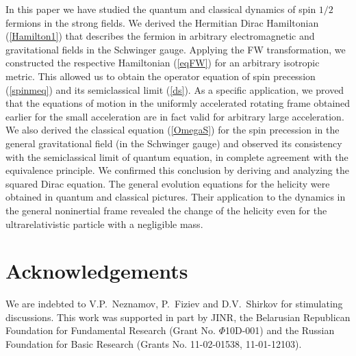 \documentclass[preprint,showpacs,preprintnumbers,eqsecnum,amsmath,amssymb]{revtex4}
\begin{document}
In this paper we have studied the quantum and classical dynamics
of spin $1/2$ fermions in the strong fields. We derived the
Hermitian Dirac Hamiltonian (\ref{Hamilton1}) that describes the
fermion in arbitrary electromagnetic and gravitational fields in
the Schwinger gauge. Applying the FW transformation, we
constructed the respective Hamiltonian (\ref{eqFW}) for an
arbitrary isotropic metric. This allowed us to obtain the operator
equation of spin precession (\ref{spinmeq}) and its semiclassical
limit (\ref{ds}). As a specific application, we proved that the
equations of motion in the uniformly accelerated rotating frame
obtained earlier for the small acceleration are in fact valid for
arbitrary large acceleration. We also derived the classical
equation (\ref{OmegaS}) for the spin precession in the general
gravitational field (in the Schwinger gauge) and observed its
consistency with the semiclassical limit of quantum equation, in
complete agreement with the equivalence principle. We confirmed
this conclusion by deriving and analyzing the squared Dirac
equation. The general evolution equations for the helicity were
obtained in quantum and classical pictures. Their application to
the dynamics in the general noninertial frame revealed the change
of the helicity even for the ultrarelativistic particle with a
negligible mass.


\section*{Acknowledgements}


We are indebted to V.P.~Neznamov, P.~Fiziev and D.V.~Shirkov for
stimulating discussions. This work was supported in part by JINR,
the Belarusian Republican Foundation for Fundamental Research
(Grant No. $\Phi$10D-001) and the Russian Foundation for Basic
Research (Grants No. 11-02-01538, 11-01-12103).
\end{document}
